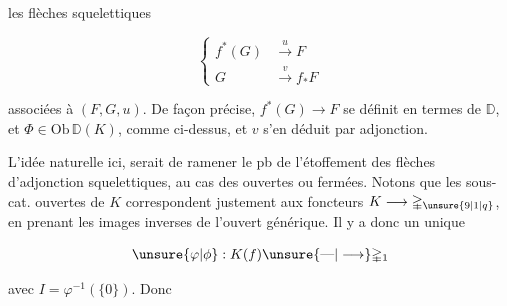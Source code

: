   les flèches squelettiques

\[
\left\{\begin{aligned}
f^*(G)&\xrightarrow{u}F\\
G&\xrightarrow{v}f_*F
\end{aligned}\right.
\]

associées à $(F,G,u)$. De façon précise, $f^*(G)\longrightarrow F$  se définit en termes de $\mathbb D$, et $\Phi\in\mathrm{Ob}\,\mathbb D(K)$, comme ci-dessus, et $v$ s'en déduit par adjonction.

L'idée naturelle ici, serait de ramener le pb de l'étoffement des flèches d'adjonction squelettiques, au cas des  ouvertes ou fermées. Notons que les sous-cat. ouvertes de $K$ correspondent justement aux foncteurs $K\longrightarrow\mathbb{\Delta}_{\unsure{9|1|q}}$, en prenant les images inverses de l'ouvert générique. Il y a donc un unique

\[
\unsure{\varphi|\phi}:K(f)\unsure{\text{---}|\longrightarrow}\mathbb{\Delta}_1
\]

avec $I=\varphi^{-1}(\{0\})$. Donc
